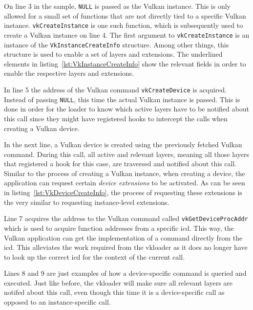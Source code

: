     On line 3 in the sample, \lstinline{NULL} is passed as the Vulkan instance.
    This is only allowed for a small set of functions that are not directly tied to a specific Vulkan instance.
    \lstinline{vkCreateInstance} is one such function, which is subsequently used to create a Vulkan instance on line 4.
    The first argument to \lstinline{vkCreateInstance} is an instance of the \lstinline{VkInstanceCreateInfo} structure.
    Among other things, this structure is used to enable a set of layers and extensions.
    The underlined elements in listing~\ref{lst:VkInstanceCreateInfo} show the relevant fields in order to enable the respective layers and extensions.

    In line 5 the address of the Vulkan command \lstinline{vkCreateDevice} is acquired.
    Instead of passing \lstinline{NULL}, this time the actual Vulkan instance is passed.
    This is done in order for the loader to know which active layers have to be notified about this call since they might have registered hooks to intercept the calls when creating a Vulkan device.

    In the next line, a Vulkan device is created using the previously fetched Vulkan command.
    During this call, all active and relevant layers, meaning all those layers that registered a hook for this case, are traversed and notified about this call.
    Similar to the process of creating a Vulkan instance, when creating a device, the application can request certain \textit{device extensions} to be activated.
    As can be seen in listing~\ref{lst:VkDeviceCreateInfo}, the process of requesting these extensions is the very similar to requesting instance-level extensions.

    Line 7 acquires the address to the Vulkan command called \lstinline{vkGetDeviceProcAddr} which is used to acquire function addresses from a specific \gls{icd}.
    This way, the Vulkan application can get the implementation of a command directly from the \gls{icd}.
    This alleviates the work required from the \gls{vkloader} as it does no longer have to look up the correct \gls{icd} for the context of the current call.

    Lines 8 and 9 are just examples of how a device-specific command is queried and executed.
    Just like before, the \gls{vkloader} will make sure all relevant layers are notifed about this call, even though this time it is a device-specific call as opposed to an instance-specific call.


